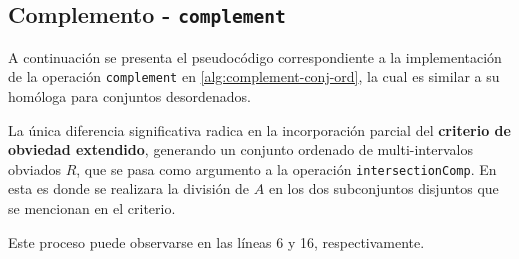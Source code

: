 \begin{comment}
\begin{algorithm}
\caption{Diferencia de conjuntos ordenados}\label{alg:two}
\begin{algorithmic}[1]
\Require $A$ y $B$ son conjuntos ordenados
\Ensure El resultado es la diferencia ordenada de $A$ con $B$
\Function{difference}{$A,B$}

\ 

\If{$A == \emptyset$ \textbf{or} $B == \emptyset$}
    \State \Return $\emptyset$
\EndIf

\

\If{\Call{maxElem}{$A$} $<$ \Call{minElem}{$B$}}
    \State \Return $A$
\EndIf

\If{\Call{maxElem}{$B$} $<$ \Call{minElem}{$A$}}
    \State \Return $A$
\EndIf

\

\State $D \gets$ \Call{complement}{$B$}
\State \Return \Call{intersection}{$A$, $D$}
\EndFunction
\end{algorithmic}
\end{algorithm}

\newpage
\end{comment}


\subsection{Complemento - \texttt{complement}}

A continuación se presenta el pseudocódigo correspondiente a la implementación de la operación \texttt{complement} en \ref{alg:complement-conj-ord}, la cual es similar a su homóloga para conjuntos desordenados. 

La única diferencia significativa radica en la incorporación parcial del \textbf{criterio de obviedad extendido}, generando un conjunto ordenado de multi-intervalos obviados $R$, que se pasa como argumento a la operación \texttt{intersectionComp}. En esta es donde se realizara la división de $A$ en los dos subconjuntos disjuntos que se mencionan en el criterio. 

Este proceso puede observarse en las líneas 6 y 16, respectivamente.


